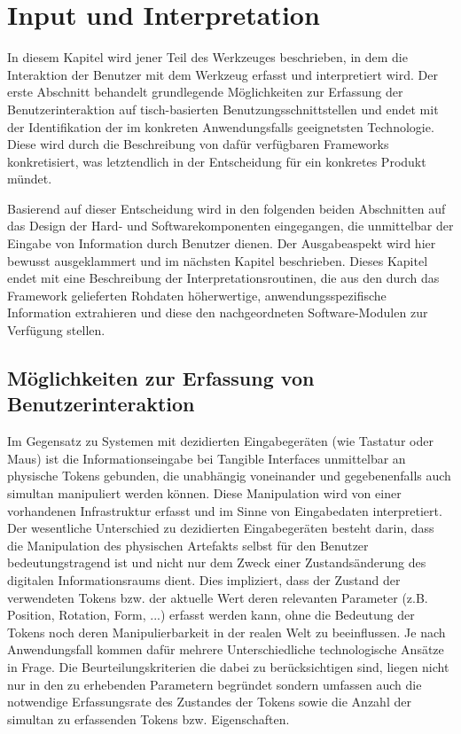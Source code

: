 \chapter{Input und Interpretation} %
\label{cha:input_&_interpretation}
In diesem Kapitel wird jener Teil des Werkzeuges beschrieben, in dem die Interaktion der Benutzer mit dem Werkzeug erfasst und interpretiert wird. Der erste Abschnitt behandelt grundlegende Möglichkeiten zur Erfassung der Benutzerinteraktion auf tisch-basierten Benutzungsschnittstellen und endet mit der Identifikation der im konkreten Anwendungsfalls geeignetsten Technologie. Diese wird durch die Beschreibung von dafür verfügbaren Frameworks konkretisiert, was letztendlich in der Entscheidung für ein konkretes Produkt mündet.

Basierend auf dieser Entscheidung wird in den folgenden beiden Abschnitten auf das Design der Hard- und Softwarekomponenten eingegangen, die unmittelbar der Eingabe von Information durch Benutzer dienen. Der Ausgabeaspekt wird hier bewusst ausgeklammert und im nächsten Kapitel beschrieben. Dieses Kapitel endet mit eine Beschreibung der Interpretationsroutinen, die aus den durch das Framework gelieferten Rohdaten höherwertige, anwendungsspezifische Information extrahieren und diese den nachgeordneten Software-Modulen zur Verfügung stellen.

\section{Möglichkeiten zur Erfassung von Benutzerinteraktion} %
\label{sec:möglichkeiten_zur_erfassung_von_benutzerinteraktion}

Im Gegensatz zu Systemen mit dezidierten Eingabegeräten (wie Tastatur oder Maus) ist die Informationseingabe bei Tangible Interfaces unmittelbar an physische Tokens gebunden, die unabhängig voneinander und gegebenenfalls auch simultan manipuliert werden können. Diese Manipulation wird von einer vorhandenen Infrastruktur erfasst und im Sinne von Eingabedaten interpretiert. Der wesentliche Unterschied zu dezidierten Eingabegeräten besteht darin, dass die Manipulation des physischen Artefakts selbst für den Benutzer bedeutungstragend ist und nicht nur dem Zweck einer Zustandsänderung des digitalen Informationsraums dient. Dies impliziert, dass der Zustand der verwendeten Tokens bzw. der aktuelle Wert deren relevanten Parameter (z.B. Position, Rotation, Form, ...) erfasst werden kann, ohne die Bedeutung der Tokens noch deren Manipulierbarkeit in der realen Welt zu beeinflussen. Je nach Anwendungsfall kommen dafür mehrere Unterschiedliche technologische Ansätze in Frage. Die Beurteilungskriterien die dabei zu berücksichtigen sind, liegen nicht nur in den zu erhebenden Parametern begründet sondern umfassen auch die notwendige Erfassungsrate des Zustandes der Tokens sowie die Anzahl der simultan zu erfassenden Tokens bzw. Eigenschaften.

